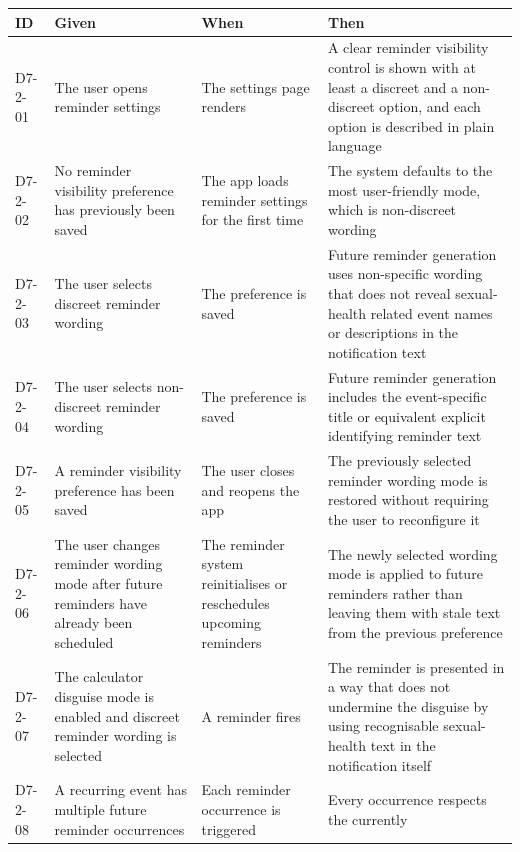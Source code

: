 \documentclass[a4paper, 12pt]{article}
\begin{document}
    \begin{longtable}
        {|L{0.12\textwidth}|L{0.24\textwidth}|L{0.24\textwidth}|L{0.32\textwidth}|}
        \hline \textbf{ID} & \textbf{Given} & \textbf{When} & \textbf{Then} \\
        \hline \endhead D7-2-01 & The user opens reminder settings & The settings
        page renders & A clear reminder visibility control is shown with at least
        a discreet and a non-discreet option, and each option is described in
        plain language \\
        \hline D7-2-02 & No reminder visibility preference has previously been
        saved & The app loads reminder settings for the first time & The system
        defaults to the most user-friendly mode, which is non-discreet wording \\
        \hline D7-2-03 & The user selects discreet reminder wording & The preference
        is saved & Future reminder generation uses non-specific wording that does
        not reveal sexual-health related event names or descriptions in the notification
        text \\
        \hline D7-2-04 & The user selects non-discreet reminder wording & The preference
        is saved & Future reminder generation includes the event-specific title or
        equivalent explicit identifying reminder text \\
        \hline D7-2-05 & A reminder visibility preference has been saved & The user
        closes and reopens the app & The previously selected reminder wording mode
        is restored without requiring the user to reconfigure it \\
        \hline D7-2-06 & The user changes reminder wording mode after future reminders
        have already been scheduled & The reminder system reinitialises or reschedules
        upcoming reminders & The newly selected wording mode is applied to future
        reminders rather than leaving them with stale text from the previous preference
        \\
        \hline D7-2-07 & The calculator disguise mode is enabled and discreet reminder
        wording is selected & A reminder fires & The reminder is presented in a way
        that does not undermine the disguise by using recognisable sexual-health
        text in the notification itself \\
        \hline D7-2-08 & A recurring event has multiple future reminder occurrences
        & Each reminder occurrence is triggered & Every occurrence respects the currently

\end{longtable}
\end{document}
